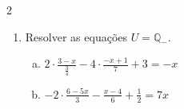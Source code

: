 \documentclass[a4paper,14pt]{article}
\begin{document}
\begin{multicols}{2}
\begin{enumerate}
\begin{enumerate}[a)]
				\item $-\Bigg(-\bigg(\frac{-4x + 7}{2} + \frac{2}{3}\bigg)+ x\Bigg) = \frac{1}{8}$ \\\\\\\\\\\\\\\\\\\\\\\\\\\\\\\\\\\\\\\\\\\\
				\item $\Bigg(\frac{-x + 2}{\frac{1}{5}} + \frac{1}{4} - 3x \Bigg) \cdot \\  \Bigg(\frac{-2x-4}{\frac{6}{7}} + \frac{x}{4} + \frac{1}{6}\Bigg) = 0$ \\\\\\\\\\\\\\\\\\\\\\\\\\\\\\\\
			\end{enumerate}
			\item Resolver as equações $U = \mathbb{Q_-}$.
			\begin{enumerate}[a)]
				\item $2 \cdot \frac{3 - x}{\frac{3}{4}} - 4 \cdot \frac{-x + 1}{7} + 3 = - x$ \newpage
				\item $-2 \cdot \frac{6 - 5x}{3} - \frac{x - 4}{6} + \frac{1}{2} = 7x$ \\\\\\\\\\\\\\\\\\\\\\\\\\\\\\\\\\\\\\

\end{enumerate}
\end{enumerate}
\end{multicols}
\end{document}
